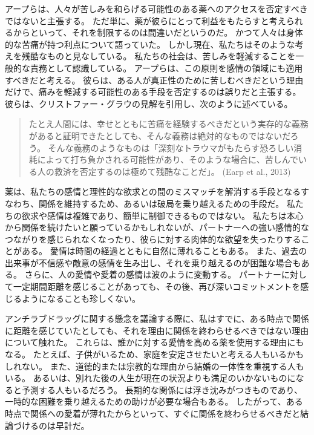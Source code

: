 \documentclass[paper=a4,book,openany]{jlreq} \usepackage{mystyle}
\begin{document}
アープらは、人々が苦しみを和らげる可能性のある薬へのアクセスを否定すべきではないと主張する。
ただ単に、薬が彼らにとって利益をもたらすと考えられるからといって、それを制限するのは間違いだというのだ。
かつて人々は身体的な苦痛が持つ利点について語っていた。
しかし現在、私たちはそのような考えを残酷なものと見なしている。
私たちの社会は、苦しみを軽減することを一般的な責務として認識している。
アープらは、この原則を感情の領域にも適用すべきだと考える。
彼らは、ある人が真正性のために苦しむべきだという理由だけで、痛みを軽減する可能性のある手段を否定するのは誤りだと主張する。
彼らは、クリストファー・グラウの見解\citep{grau06:_etern_sunsh_spotl_mind_moral_memor}を引用し、次のように述べている。

\begin{quote}
たとえ人間には、幸せとともに苦痛を経験するべきだという実存的な義務があると証明できたとしても、そんな義務は絶対的なものではないだろう。
そんな義務のようなものは「深刻なトラウマがもたらす恐ろしい消耗によって打ち負かされる可能性があり、そのような場合に、苦しんでいる人の救済を否定するのは極めて残酷なことだ」。
(Earp et al., 2013)
  \nocite{earp13:_if_i_could_just_stop_lovin_you}

\end{quote}

薬は、私たちの感情と理性的な欲求との間のミスマッチを解消する手段となる{\DDASH}すなわち、関係を維持するため、あるいは破局を乗り越えるための手段だ。
私たちの欲求や感情は複雑であり、簡単に制御できるものではない。
私たちは本心から関係を続けたいと願っているかもしれないが、パートナーへの強い感情的なつながりを感じられなくなったり、彼らに対する肉体的な欲望を失ったりすることがある。
愛情は時間の経過とともに自然に薄れることもある。
また、過去の出来事が不信感や敵意の感情を生み出し、それを乗り越えるのが困難な場合もある。
さらに、人の愛情や愛着の感情は波のように変動する。
パートナーに対して一定期間距離を感じることがあっても、その後、再び深いコミットメントを感じるようになることも珍しくない。

アンチラブドラッグに関する懸念を議論する際に、私はすでに、ある時点で関係に距離を感じていたとしても、それを理由に関係を終わらせるべきではない理由について触れた。
これらは、誰かに対する愛情を高める薬を使用する理由にもなる。
たとえば、子供がいるため、家庭を安定させたいと考える人もいるかもしれない。
また、道徳的または宗教的な理由から結婚の一体性を重視する人もいる。
あるいは、別れた後の人生が現在の状況よりも満足のいかないものになると予測する人もいるだろう。
長期的な関係には浮き沈みがつきものであり、一時的な困難を乗り越えるための助けが必要な場合もある。
したがって、ある時点で関係への愛着が薄れたからといって、すぐに関係を終わらせるべきだと結論づけるのは早計だ。
\end{document}
